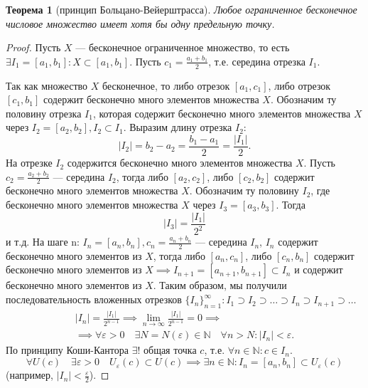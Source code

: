 \documentclass[a4paper,12pt]{article} %
\newtheorem{theorem}{Теорема}[subsection]
\theoremstyle{remark}
\begin{document}
\begin{theorem}[принцип Больцано-Вейерштрасса]
	Любое ограниченное бесконечное числовое множество имеет хотя бы одну предельную точку.
\end{theorem}
\begin{proof}
	Пусть $X$ --- бесконечное ограниченное множество, то есть $\exists I_1 =[a_1, b_1] : X\subset [a_1, b_1]$.
	Пусть $c_1=\frac{a_1+b_1}{2}$, т.е. середина отрезка $I_1$.
	\begin{center}
	\end{center}
	Так как множество $X$ бесконечное, то либо отрезок $[a_1, c_1]$, либо отрезок $[c_1, b_1]$ содержит бесконечно много элементов множества $X$. Обозначим ту половину отрезка $I_1$, которая содержит бесконечно много элементов множества $X$ через $I_2 = [a_2, b_2], I_2\subset I_1$. Выразим длину отрезка $I_2$:
\[
	|I_2| = b_2-a_2 = \frac{b_1-a_1}{2} = \frac{|I_1|}{2}
.\] 
На отрезке $I_2$ содержится бесконечно много элементов множества $X$.
Пусть $c_2=\frac{a_2+b_2}{2}$ --- середина $I_2$, тогда либо $[a_2, c_2]$, либо $[c_2, b_2]$ содержит бесконечно много элементов множества $X$. Обозначим ту половину $I_2$, где бесконечно много элементов множества $X$ через $I_3 = [a_3, b_3]$. Тогда
\[
|I_3| = \frac{|I_1|}{2^2}
\] 
и т.д. На шаге n: $I_n=[a_n, b_n], c_n = \frac{a_n + b_n}{2}$ --- середина $I_n$, $I_n$ содержит бесконечно много элементов из $X$, тогда либо $[a_n, c_n]$, либо $[c_n, b_n]$ содержит бесконечно много элементов из $X \implies I_{n+1}=[a_{n+1}, b_{n+1}]\subset I_n$ и содержит бесконечно много элементов из $X$. Таким образом, мы получили последовательность вложенных отрезков $\{I_n\}_{n=1}^{\infty} : I_1\supset I_2\supset \ldots\supset I_n\supset I_{n+1}\supset \ldots$
\begin{multline}
	|I_n|=\frac{|I_1|}{2^{n-1}} \implies \lim_{n \to \infty} \frac{|I_1|}{2^{n-1}} = 0 \implies \\
	\implies \forall \varepsilon>0 \quad \exists N=N(\varepsilon)\in \mathbb{N} \quad \forall n>N : |I_n| < \varepsilon.
\end{multline}
По принципу Коши-Кантора $\exists !$ общая точка $c$, т.е. $\forall n\in \mathbb{N} : c\in I_n$.
\[
	\forall U(c) \quad \exists \varepsilon>0 \quad U_\varepsilon(c) \subset U(c) \implies \exists n\in \mathbb{N} : I_n=[a_n, b_n] \subset U_\varepsilon(c)
\] 
(например, $|I_n| < \frac{\varepsilon}{2}$).


\end{proof}
\end{document}
